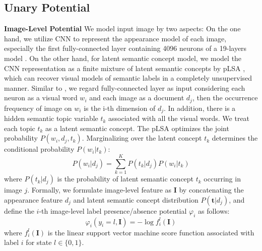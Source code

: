 \subsection{Unary Potential}
\textbf{Image-Level Potential}
We model input image by two aspects: On the one hand, we utilize CNN to represent the appearance model of each image, especially the first fully-connected layer containing 4096 neurons of a 19-layers model \cite{simonyan2014very}.
On the other hand, for latent semantic concept model, we model the CNN representation as a finite mixture of latent semantic concepts by pLSA \cite{sivic2005discovering}, which can recover visual models of semantic labels in a completely unsupervised manner.
Similar to \cite{wang2014weakly}, we regard fully-connected layer as input considering each neuron as a visual word $w_i$ and each image as a document $d_j$, then the occurrence frequency of image on $w_i$ is the i-th dimension of $d_j$.
In addition, there is a hidden semantic topic variable $t_k$ associated with all the visual words.
We treat each topic $t_k$ as a latent semantic concept. The pLSA optimizes the joint probability $P(w_i,d_j,t_k)$.
Marginalizing over the latent concept $t_k$ determines the conditional probability $P(w_i|t_k)$:
\begin{equation}
  P(w_i|d_j) = \sum_{k=1}^K{P(t_k|d_j)P(w_i|t_k)}
\end{equation}
where $P(t_k|d_j)$ is the probability of latent semantic concept $t_k$ occurring in image $j$.
Formally, we formulate image-level feature as $\boldsymbol{I}$ by concatenating the appearance feature $d_j$ and latent semantic concept distribution $P(\boldsymbol{t}|d_j)$, and define the $i$-th image-level label presence/absence potential $\varphi_{i}$ as follows:
\begin{equation}
    \varphi_{i}(y_i=l,\boldsymbol{I}) = -\log f_{i}^l(\boldsymbol{I})
    \label{eq:global}
\end{equation}
where $f_{i}^l(\boldsymbol{I})$ is the linear support vector machine score function associated with label $i$ for state $l \in \{0,1\}$.

